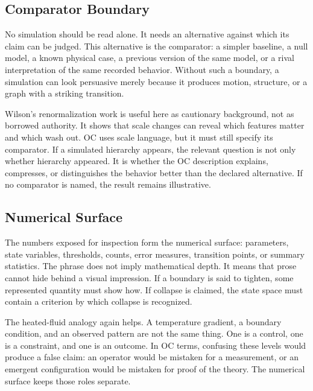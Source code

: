 \documentclass[11pt,a4paper,openany]{book}
\begin{document}
\subsection{Comparator Boundary}
No simulation should be read alone. It needs an alternative against which its claim can be judged. This alternative is the comparator: a simpler baseline, a null model, a known physical case, a previous version of the same model, or a rival interpretation of the same recorded behavior. Without such a boundary, a simulation can look persuasive merely because it produces motion, structure, or a graph with a striking transition. \cite{wilson_renormalization,landau_stat_physics}\par
Wilson's renormalization work is useful here as cautionary background, not as borrowed authority. It shows that scale changes can reveal which features matter and which wash out. OC uses scale language, but it must still specify its comparator. If a simulated hierarchy appears, the relevant question is not only whether hierarchy appeared. It is whether the OC description explains, compresses, or distinguishes the behavior better than the declared alternative. If no comparator is named, the result remains illustrative.\par
\subsection{Numerical Surface}
The numbers exposed for inspection form the numerical surface: parameters, state variables, thresholds, counts, error measures, transition points, or summary statistics. The phrase does not imply mathematical depth. It means that prose cannot hide behind a visual impression. If a boundary is said to tighten, some represented quantity must show how. If collapse is claimed, the state space must contain a criterion by which collapse is recognized. \cite{wilson_renormalization,landau_stat_physics}\par
The heated-fluid analogy again helps. A temperature gradient, a boundary condition, and an observed pattern are not the same thing. One is a control, one is a constraint, and one is an outcome. In OC terms, confusing these levels would produce a false claim: an operator would be mistaken for a measurement, or an emergent configuration would be mistaken for proof of the theory. The numerical surface keeps those roles separate.\par
\end{document}
